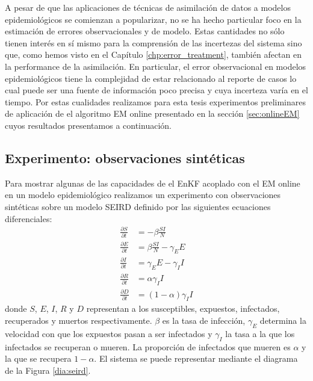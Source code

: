 A pesar de que las aplicaciones de técnicas de asimilación de datos a modelos epidemiológicos se comienzan a popularizar, no se ha hecho particular foco en la estimación de errores observacionales y de modelo. Estas cantidades no sólo tienen interés en sí mismo para la comprensión de las incertezas del sistema sino que, como hemos visto en el Capítulo \ref{chp:error_treatment}, también afectan en la performance de la asimilación. En particular, el error observacional en modelos epidemiológicos tiene la complejidad de estar relacionado al reporte de casos lo cual puede ser una fuente de información poco precisa y cuya incerteza varía en el tiempo. Por estas cualidades realizamos para esta tesis experimentos preliminares de aplicación de el algoritmo EM online presentado en la sección \ref{sec:onlineEM} cuyos resultados presentamos a continuación.

\subsection{Experimento: observaciones sintéticas} \label{sec:online_em_seird_synthetic}
Para mostrar algunas de las capacidades de el EnKF acoplado con el EM online en un modelo epidemiológico realizamos un experimento con observaciones sintéticas sobre un modelo SEIRD definido por las siguientes ecuaciones diferenciales:
\begin{align} \label{eq:seird}
    \frac{\partial S}{\partial t} &= -\beta \frac{SI}{N}\\
    \frac{\partial E}{\partial t} &= \beta \frac{SI}{N} - \gamma_E E \\
    \frac{\partial I}{\partial t} &= \gamma_E E - \gamma_I I \\
    \frac{\partial R}{\partial t} &= \alpha \gamma_I I \\
    \frac{\partial D}{\partial t} &= (1-\alpha) \gamma_I I
\end{align}
donde $S$, $E$, $I$, $R$ y $D$ representan a los susceptibles, expuestos, infectados, recuperados y muertos respectivamente. $\beta$ es la tasa de infección, $\gamma_E$ determina la velocidad con que los expuestos pasan a ser infectados y $\gamma_I$ la tasa a la que los infectados se recuperan o mueren. La proporción de infectados que mueren es $\alpha$ y la que se recupera $1 - \alpha$. El sistema se puede representar mediante el diagrama de la Figura \ref{dia:seird}. 

